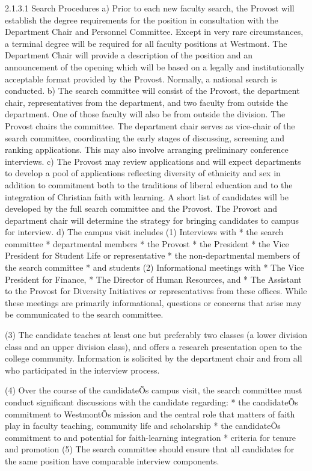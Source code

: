 \documentclass[letterpaper, 11pt]{article}
\begin{document}
2.1.3.1 Search Procedures
a)  Prior to each new faculty search, the Provost will establish the degree requirements for the position in consultation with the Department Chair and Personnel Committee. Except in very rare circumstances, a terminal degree will be required for all faculty positions at Westmont.  The Department Chair will provide a description of the position and an announcement of the opening which will be based on a legally and institutionally acceptable format provided by the Provost.  Normally, a national search is conducted.
b) The search committee will consist of the Provost, the department chair, representatives from the department, and two faculty from outside the department. One of those faculty will also be from outside the division. The Provost chairs the committee. The department chair serves as vice-chair of the search committee, coordinating the early stages of discussing, screening and ranking applications. This may also involve arranging preliminary conference interviews.
c) The Provost may review applications and will expect departments to develop a pool of applications reflecting diversity of ethnicity and sex in addition to commitment both to the traditions of liberal education and to the integration of Christian faith with learning.  A short list of candidates will be developed by the full search committee and the Provost.  The Provost and department chair will determine the strategy for bringing candidates to campus for interview.
d)  The campus visit includes
(1) Interviews with
* the search committee
* departmental members
* the Provost
* the President
* the Vice President for Student Life or representative
* the non-departmental members of the search committee
* and students
(2) Informational meetings with
* The Vice President for Finance,
* The Director of Human Resources, and
* The Assistant to the Provost for Diversity Initiatives or representatives from these offices.  While these meetings are primarily informational, questions or concerns that arise may be communicated to the search committee.

(3) The candidate teaches at least one but preferably two classes (a lower division class and an upper division class), and offers a research presentation open to the college community.  Information is solicited by the department chair and from all who participated in the interview process.

(4) Over the course of the candidateÕs campus visit, the search committee must conduct significant discussions with the candidate regarding:
* the candidateÕs commitment to WestmontÕs mission and the central role that matters of faith play in faculty teaching, community life and scholarship
* the candidateÕs commitment to and potential for faith-learning integration
* criteria for tenure and promotion
(5) The search committee should ensure that all candidates for the same position have comparable interview components.
\end{document}
